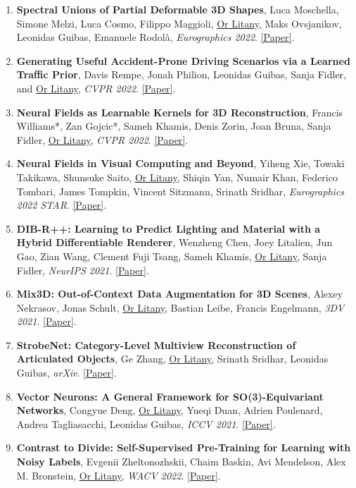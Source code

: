 \begin{enumerate}[leftmargin=*]
    \item \textbf{Spectral Unions of Partial Deformable 3D Shapes}, Luca Moschella, Simone Melzi, Luca Cosmo, Filippo Maggioli, \underline{Or Litany}, Maks Ovsjanikov, Leonidas Guibas, Emanuele Rodolà, \textit{Eurographics 2022}. \href{https://arxiv.org/abs/2104.00514}{[Paper]}.
    \item \textbf{Generating Useful Accident-Prone Driving Scenarios via a Learned Traffic Prior}, Davis Rempe, Jonah Philion, Leonidas Guibas, Sanja Fidler, and \underline{Or Litany}, \textit{CVPR 2022}. \href{https://arxiv.org/abs/2112.05077}{[Paper]}.
    \item \textbf{Neural Fields as Learnable Kernels for 3D Reconstruction}, Francis Williams*, Zan Gojcic*, Sameh Khamis, Denis Zorin, Joan Bruna, Sanja Fidler, \underline{Or Litany}, \textit{CVPR 2022}. \href{https://arxiv.org/abs/2111.13674}{[Paper]}.
    \item \textbf{Neural Fields in Visual Computing and Beyond}, Yiheng Xie, Towaki Takikawa, Shunsuke Saito, \underline{Or Litany}, Shiqin Yan, Numair Khan, Federico Tombari, James Tompkin, Vincent Sitzmann, Srinath Sridhar, \textit{Eurographics 2022 STAR}. \href{https://arxiv.org/abs/2111.11426}{[Paper]}.
    \item \textbf{DIB-R++: Learning to Predict Lighting and Material with a Hybrid Differentiable Renderer}, Wenzheng Chen, Joey Litalien, Jun Gao, Zian Wang, Clement Fuji Tsang, Sameh Khamis, \underline{Or Litany}, Sanja Fidler, \textit{NeurIPS 2021}. \href{https://arxiv.org/abs/2111.00140}{[Paper]}.
    \item \textbf{Mix3D: Out-of-Context Data Augmentation for 3D Scenes}, Alexey Nekrasov, Jonas Schult, \underline{Or Litany}, Bastian Leibe, Francis Engelmann, \textit{3DV 2021}. \href{https://arxiv.org/abs/2110.02210}{[Paper]}.
    \item \textbf{StrobeNet: Category-Level Multiview Reconstruction of Articulated Objects}, Ge Zhang, \underline{Or Litany}, Srinath Sridhar, Leonidas Guibas, \textit{arXiv}. \href{https://arxiv.org/abs/2105.08016}{[Paper]}.
    \item \textbf{Vector Neurons: A General Framework for SO(3)-Equivariant Networks}, Congyue Deng, \underline{Or Litany}, Yueqi Duan, Adrien Poulenard, Andrea Tagliasacchi, Leonidas Guibas, \textit{ICCV 2021}. \href{https://arxiv.org/abs/2104.12229}{[Paper]}.
    \item \textbf{Contrast to Divide: Self-Supervised Pre-Training for Learning with Noisy Labels}, Evgenii Zheltonozhskii, Chaim Baskin, Avi Mendelson, Alex M. Bronstein, \underline{Or Litany}, \textit{WACV 2022}. \href{https://arxiv.org/abs/2103.13646}{[Paper]}.

\end{enumerate}
